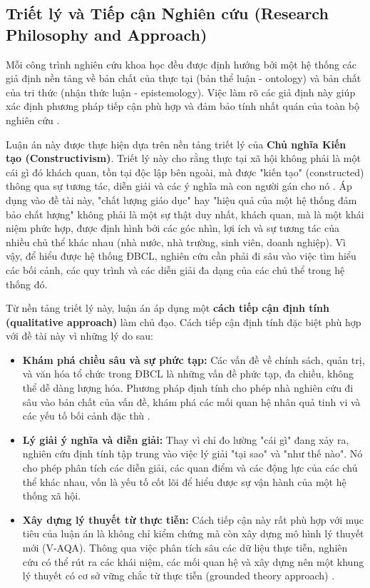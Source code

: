 \documentclass[12pt, a4paper, openany]{report}
\begin{document}
\subsection{Triết lý và Tiếp cận Nghiên cứu (Research Philosophy and Approach)}
\label{subsec:triet_ly_tiep_can}

Mỗi công trình nghiên cứu khoa học đều được định hướng bởi một hệ thống các giả định nền tảng về bản chất của thực tại (bản thể luận - ontology) và bản chất của tri thức (nhận thức luận - epistemology). Việc làm rõ các giả định này giúp xác định phương pháp tiếp cận phù hợp và đảm bảo tính nhất quán của toàn bộ nghiên cứu \cite{Creswell2018}.

Luận án này được thực hiện dựa trên nền tảng triết lý của \textbf{Chủ nghĩa Kiến tạo (Constructivism)}. Triết lý này cho rằng thực tại xã hội không phải là một cái gì đó khách quan, tồn tại độc lập bên ngoài, mà được "kiến tạo" (constructed) thông qua sự tương tác, diễn giải và các ý nghĩa mà con người gán cho nó \cite{GubaLincoln1994}. Áp dụng vào đề tài này, "chất lượng giáo dục" hay "hiệu quả của một hệ thống đảm bảo chất lượng" không phải là một sự thật duy nhất, khách quan, mà là một khái niệm phức hợp, được định hình bởi các góc nhìn, lợi ích và sự tương tác của nhiều chủ thể khác nhau (nhà nước, nhà trường, sinh viên, doanh nghiệp). Vì vậy, để hiểu được hệ thống ĐBCL, nghiên cứu cần phải đi sâu vào việc tìm hiểu các bối cảnh, các quy trình và các diễn giải đa dạng của các chủ thể trong hệ thống đó.

Từ nền tảng triết lý này, luận án áp dụng một \textbf{cách tiếp cận định tính (qualitative approach)} làm chủ đạo. Cách tiếp cận định tính đặc biệt phù hợp với đề tài này vì những lý do sau:
\begin{itemize}
    \item \textbf{Khám phá chiều sâu và sự phức tạp:} Các vấn đề về chính sách, quản trị, và văn hóa tổ chức trong ĐBCL là những vấn đề phức tạp, đa chiều, không thể dễ dàng lượng hóa. Phương pháp định tính cho phép nhà nghiên cứu đi sâu vào bản chất của vấn đề, khám phá các mối quan hệ nhân quả tinh vi và các yếu tố bối cảnh đặc thù \cite{Yin2018}.
    \item \textbf{Lý giải ý nghĩa và diễn giải:} Thay vì chỉ đo lường "cái gì" đang xảy ra, nghiên cứu định tính tập trung vào việc lý giải "tại sao" và "như thế nào". Nó cho phép phân tích các diễn giải, các quan điểm và các động lực của các chủ thể khác nhau, vốn là yếu tố cốt lõi để hiểu được sự vận hành của một hệ thống xã hội.
    \item \textbf{Xây dựng lý thuyết từ thực tiễn:} Cách tiếp cận này rất phù hợp với mục tiêu của luận án là không chỉ kiểm chứng mà còn xây dựng mô hình lý thuyết mới (V-AQA). Thông qua việc phân tích sâu các dữ liệu thực tiễn, nghiên cứu có thể rút ra các khái niệm, các mối quan hệ và xây dựng nên một khung lý thuyết có cơ sở vững chắc từ thực tiễn (grounded theory approach) \cite{Charmaz2006}.
\end{itemize}
\end{document}
